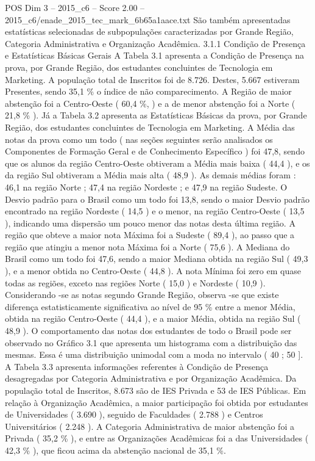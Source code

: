 \begin{textsample}{POS Dim 3 – 2015\_c6 – Score 2.00 – 2015\_c6/enade\_2015\_tec\_mark\_6b65a1aace.txt}
São também apresentadas estatísticas selecionadas de subpopulações caracterizadas por Grande Região, Categoria Administrativa e Organização Acadêmica. 3.1.1 Condição de Presença e Estatísticas Básicas Gerais A Tabela 3.1 apresenta a Condição de Presença na prova, por Grande Região, dos estudantes concluintes de Tecnologia em Marketing.
A população total de Inscritos foi de 8.726.
Destes, 5.667 estiveram Presentes, sendo 35,1 \% o índice de não comparecimento.
A Região de maior abstenção foi a Centro-Oeste ( 60,4 \%, ) e a de menor abstenção foi a Norte ( 21,8 \% ).
Já a Tabela 3.2 apresenta as Estatísticas Básicas da prova, por Grande Região, dos estudantes concluintes de Tecnologia em Marketing.
A Média das notas da prova como um todo ( nas seções seguintes serão analisados os Componentes de Formação Geral e de Conhecimento Específico ) foi 47,8, sendo que os alunos da região Centro-Oeste obtiveram a Média mais baixa ( 44,4 ), e os da região Sul obtiveram a Média mais alta ( 48,9 ).
As demais médias foram : 46,1 na região Norte ; 47,4 na região Nordeste ; e 47,9 na região Sudeste.
O Desvio padrão para o Brasil como um todo foi 13,8, sendo o maior Desvio padrão encontrado na região Nordeste ( 14,5 ) e o menor, na região Centro-Oeste ( 13,5 ), indicando uma dispersão um pouco menor das notas desta última região.
A região que obteve a maior nota Máxima foi a Sudeste ( 89,4 ), ao passo que a região que atingiu a menor nota Máxima foi a Norte ( 75,6 ).
A Mediana do Brasil como um todo foi 47,6, sendo a maior Mediana obtida na região Sul ( 49,3 ), e a menor obtida no Centro-Oeste ( 44,8 ).
A nota Mínima foi zero em quase todas as regiões, exceto nas regiões Norte ( 15,0 ) e Nordeste ( 10,9 ).
Considerando -se as notas segundo Grande Região, observa -se que existe diferença estatisticamente significativa ao nível de 95 \% entre a menor Média, obtida na região Centro-Oeste ( 44,4 ), e a maior Média, obtida na região Sul ( 48,9 ).
O comportamento das notas dos estudantes de todo o Brasil pode ser observado no Gráfico 3.1 que apresenta um histograma com a distribuição das mesmas.
Essa é uma distribuição unimodal com a moda no intervalo ( 40 ; 50 ].
A Tabela 3.3 apresenta informações referentes à Condição de Presença desagregadas por Categoria Administrativa e por Organização Acadêmica.
Da população total de Inscritos, 8.673 são de IES Privada e 53 de IES Públicas.
Em relação à Organização Acadêmica, a maior participação foi obtida por estudantes de Universidades ( 3.690 ), seguido de Faculdades ( 2.788 ) e Centros Universitários ( 2.248 ).
A Categoria Administrativa de maior abstenção foi a Privada ( 35,2 \% ), e entre as Organizações Acadêmicas foi a das Universidades ( 42,3 \% ), que ficou acima da abstenção nacional de 35,1 \%.

\end{textsample}
